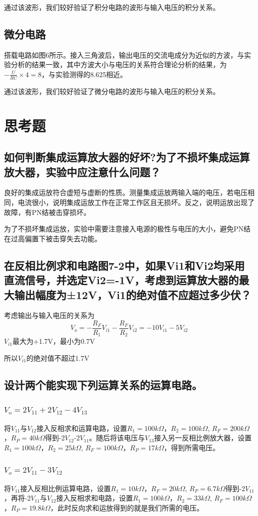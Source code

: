 \documentclass[UTF8]{article}
\begin{document}
通过该波形，我们较好验证了积分电路的波形与输入电压的积分关系。


\subsection{微分电路}
搭载电路如图6所示。接入三角波后，输出电压的交流电成分为近似的方波，与实验分析的结果一致，其中方波大小与电压的关系符合理论分析的结果，为$-\frac{U}{RC} \times 4 = 8$，与实验测得的8.625相近。

通过该波形，我们较好验证了微分电路的波形与输入电压的积分关系。

\section{思考题}
	\subsection{如何判断集成运算放大器的好坏?为了不损坏集成运算放大器，实验中应注意什么问题？}
	良好的集成运放符合虚短与虚断的性质。测量集成运放两输入端的电压，若电压相同，电流很小，说明集成运放工作在正常工作区且无损坏。反之，说明运放出现了故障，有PN结被击穿损坏。
	
	为了不损坏集成运放，实验中需要注意接入电源的极性与电压的大小，避免PN结在过高偏置下被击穿失去功能。
	
	\subsection{在反相比例求和电路图7-2中，如果Vi1和Vi2均采用直流信号，并选定Vi2=-1V，考虑到运算放大器的最大输出幅度为±12V，Vi1的绝对值不应超过多少伏？}
	考虑输出与输入电压的关系为
	 $$
	V_o=-\frac{R_F}{R_1} V_{i1}-\frac{R_F}{R_2} V_{i2} = -10V_{i1}-5V_{i2}
	$$
	$V_{i1}$最大为+1.7V，最小为0.7V
	
	所以$V_{i1}$的绝对值不超过1.7V
	
	\subsection{设计两个能实现下列运算关系的运算电路。}
	
	\subsubsection{$V_{\mathrm{o}}=2 V_{11}+2 V_{12}-4 V_{13}$}
	将$V_{11}$与$V_{12}$接入反相求和运算电路，设置$R_1 = 100k \Omega$，$R_2 = 100k \Omega$, $R_F = 200k \Omega$，$R_P = 40k \Omega$得到-2$V_{12}$-2$V_{11}$。随后将该电压与$V_{13}$接入另一反相比例放大器，设置$R_1 = 100k \Omega$，$R_2 = 25k \Omega$, $R_F = 100k \Omega$，$R_P = 17k \Omega$，得到所需电压。
	
	\subsubsection{$V_{o}=2 V_{11}-3 V_{12}$}
	将$V_{11}$接入反相比例运算电路，设置$R_1 = 10k \Omega$，$R_F = 20k \Omega$, $R_P = 6.7k \Omega$得到-2$V_{11}$，再将-2$V_{11}$与$V_{12}$接入反相求和电路，设置$R_1 = 100k \Omega$，$R_2 = 33k \Omega$, $R_F = 100k \Omega$，$R_P = 19.8k \Omega$，此时反向求和运放得到的就是我们所需的电压。
	
\end{document}
